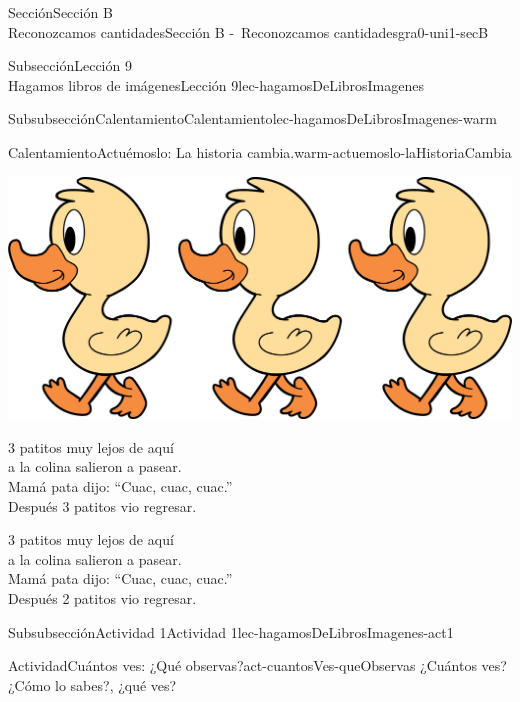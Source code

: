 \begin{sectionptx}{Sección}{{\Large Sección B\\}Reconozcamos cantidades}{}{Sección B -~Reconozcamos cantidades}{}{}{gra0-uni1-secB}
\begin{subsectionptx}{Subsección}{{\normalsize Lección 9\\[-0.05cm]}Hagamos libros de imágenes}{}{Lección 9}{}{}{lec-hagamosDeLibrosImagenes}
\begin{subsubsectionptx}{Subsubsección}{Calentamiento}{}{Calentamiento}{}{}{lec-hagamosDeLibrosImagenes-warm}
\begin{exploration}{Calentamiento}{Actuémoslo: La historia cambia.}{warm-actuemoslo-laHistoriaCambia}
\begin{image}{0.0}{1}{0.0}{}
\includegraphics[max width=\linewidth, center]{external/png-source/3 ducks.png}
\end{image}%
%
\par
3 patitos muy lejos de aquí\\
 a la colina salieron a pasear.\\
 Mamá pata dijo: “Cuac, cuac, cuac.”\\
 Después 3 patitos vio regresar.%
\par
3 patitos muy lejos de aquí\\
 a la colina salieron a pasear.\\
 Mamá pata dijo: “Cuac, cuac, cuac.”\\
 Después 2 patitos vio regresar.%
\end{exploration}%
\end{subsubsectionptx}
%
%
\typeout{************************************************}
\typeout{************************************************}
%
\clearpage
\begin{subsubsectionptx}{Subsubsección}{Actividad 1}{}{Actividad 1}{}{}{lec-hagamosDeLibrosImagenes-act1}
\begin{activity}{Actividad}{Cuántos ves: ¿Qué observas?}{act-cuantosVes-queObservas}%
¿Cuántos ves?\\
 ¿Cómo lo sabes?, ¿qué ves?%
\begin{sidebyside}{2}{0}{0}{0}%
\begin{sbspanel}{0.5}%

\end{sbspanel}
\end{sidebyside}
\end{activity}
\end{subsubsectionptx}
\end{subsectionptx}
\end{sectionptx}
